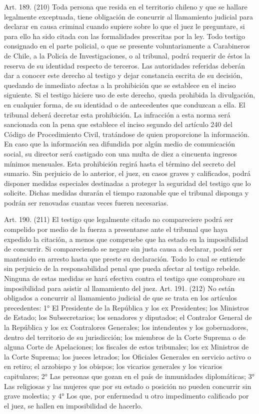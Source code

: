     Art. 189. (210) Toda persona que resida en el territorio chileno y que se hallare legalmente exceptuada, tiene obligación de concurrir al llamamiento judicial para declarar en causa criminal cuando supiere sobre lo que el juez le preguntare, si para ello ha sido citada con las formalidades prescritas por la ley.
    Todo testigo consignado en el parte policial, o que se presente voluntariamente a Carabineros de Chile, a la Policía de Investigaciones, o al tribunal, podrá requerir de éstos la reserva de su identidad respecto de terceros.
    Las autoridades referidas deberán dar a conocer este derecho al testigo y dejar constancia escrita de su decisión, quedando de inmediato afectas a la prohibición que se establece en el inciso siguiente.
    Si el testigo hiciere uso de este derecho, queda prohibida la divulgación, en cualquier forma, de su identidad o de antecedentes que conduzcan a ella. El tribunal deberá decretar esta prohibición. La infracción a esta norma será sancionada con la pena que establece el inciso segundo del artículo 240 del Código de Procedimiento Civil, tratándose de quien proporcione la información. En caso que la información sea difundida por algún medio de comunicación social, su director será castigado con una multa de diez a cincuenta ingresos mínimos mensuales.
    Esta prohibición regirá hasta el término del secreto del sumario.
    Sin perjuicio de lo anterior, el juez, en casos graves y calificados, podrá disponer medidas especiales destinadas a proteger la seguridad del testigo que lo solicite. Dichas medidas durarán el tiempo razonable que el tribunal disponga y podrán ser renovadas cuantas veces fueren necesarias.

    Art. 190. (211) El testigo que legalmente citado no compareciere podrá ser compelido por medio de la fuerza a presentarse ante el tribunal que haya expedido la citación, a menos que compruebe que ha estado en la imposibilidad de concurrir.
    Si compareciendo se negare sin justa causa a declarar, podrá ser mantenido en arresto hasta que preste su declaración.
    Todo lo cual se entiende sin perjuicio de la responsabilidad penal que pueda afectar al testigo rebelde.
    Ninguna de estas medidas se hará efectiva contra el testigo que comprobare su imposibilidad para asistir al llamamiento del juez.
    Art. 191. (212) No están obligados a concurrir al llamamiento judicial de que se trata en los artículos precedentes:
    1° El Presidente de la República y los ex Presidentes; los Ministros de Estado;
los Subsecretarios; los senadores y diputados; el Contralor General de la República y los ex Contralores Generales; los intendentes y los gobernadores, dentro del territorio de su jurisdicción; los miembros de la Corte Suprema o de alguna Corte de Apelaciones; los fiscales de estos tribunales; los ex Ministros de la Corte Suprema; los jueces letrados; los Oficiales Generales en servicio activo o en retiro; el arzobispo y los obispos; los vicarios generales y los vicarios capitulares;
    2° Las personas que gozan en el país de inmunidades diplomáticas;
    3° Las religiosas y las mujeres que por su estado o posición no pueden concurrir sin grave molestia; y
    4° Los que, por enfermedad u otro impedimento calificado por el juez, se hallen en imposibilidad de hacerlo.

